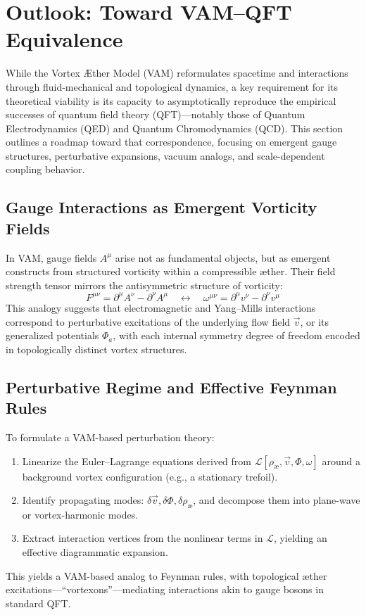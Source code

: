 \section{Outlook: Toward VAM–QFT Equivalence}\label{sec:vam_qft_outlook}

While the Vortex \AE ther Model (VAM) reformulates spacetime and interactions through fluid-mechanical and topological dynamics, a key requirement for its theoretical viability is its capacity to asymptotically reproduce the empirical successes of quantum field theory (QFT)—notably those of Quantum Electrodynamics (QED) and Quantum Chromodynamics (QCD). This section outlines a roadmap toward that correspondence, focusing on emergent gauge structures, perturbative expansions, vacuum analogs, and scale-dependent coupling behavior.

\subsection{Gauge Interactions as Emergent Vorticity Fields}

In VAM, gauge fields \( A^\mu \) arise not as fundamental objects, but as emergent constructs from structured vorticity within a compressible æther. Their field strength tensor mirrors the antisymmetric structure of vorticity:
\begin{equation}
    F^{\mu\nu} = \partial^\mu A^\nu - \partial^\nu A^\mu
    \quad \longleftrightarrow \quad
    \omega^{\mu\nu} = \partial^\mu v^\nu - \partial^\nu v^\mu
\end{equation}
This analogy suggests that electromagnetic and Yang–Mills interactions correspond to perturbative excitations of the underlying flow field \( \vec{v} \), or its generalized potentials \( \Phi_a \), with each internal symmetry degree of freedom encoded in topologically distinct vortex structures.

\subsection{Perturbative Regime and Effective Feynman Rules}

To formulate a VAM-based perturbation theory:
\begin{enumerate}
    \item Linearize the Euler–Lagrange equations derived from \( \mathcal{L}[\rho_\text{\ae}, \vec{v}, \Phi, \omega] \) around a background vortex configuration (e.g., a stationary trefoil).
    \item Identify propagating modes: \( \delta \vec{v}, \delta \Phi, \delta \rho_\text{\ae} \), and decompose them into plane-wave or vortex-harmonic modes.
    \item Extract interaction vertices from the nonlinear terms in \( \mathcal{L} \), yielding an effective diagrammatic expansion.
\end{enumerate}
This yields a VAM-based analog to Feynman rules, with topological æther excitations—“vortexons”—mediating interactions akin to gauge bosons in standard QFT.

